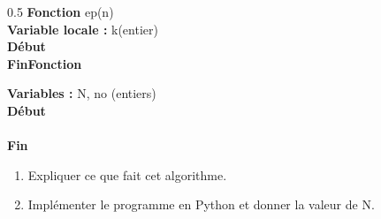 \begin{boxexstheorieligne}
\begin{center}
\begin{affichagealgorithme}{0.5}
\textbf{Fonction} ep(n)\\
\textbf{Variable locale : } k(entier)\\
\textbf{Début}\\
\textbf{FinFonction}

\vspace{1cm}
\textbf{Variables : } N, no (entiers)\\
\textbf{Début}\\
\\
\textbf{Fin}
\end{affichagealgorithme}
\end{center}



\makeatletter
\begin{enumerate}[label=\alph*)]
\item Expliquer ce que fait cet algorithme.\par\nobreak\@nobreaktrue
\item Implémenter le programme en Python et donner la valeur de N.\par\nobreak\@nobreaktrue
\end{enumerate}
\makeatother
\end{boxexstheorieligne}



\clearpage
